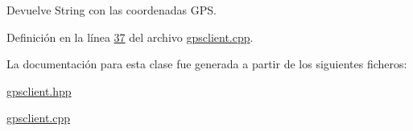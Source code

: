 \begin{DoxyReturn}{Devuelve}
String con las coordenadas G\+PS. 
\end{DoxyReturn}


Definición en la línea \hyperlink{gpsclient_8cpp_source_l00037}{37} del archivo \hyperlink{gpsclient_8cpp_source}{gpsclient.\+cpp}.



La documentación para esta clase fue generada a partir de los siguientes ficheros\+:\begin{DoxyCompactItemize}
\item 
\hyperlink{gpsclient_8hpp}{gpsclient.\+hpp}\item 
\hyperlink{gpsclient_8cpp}{gpsclient.\+cpp}\end{DoxyCompactItemize}
